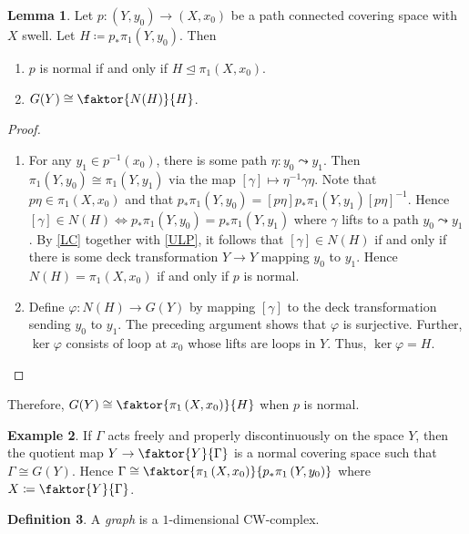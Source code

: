 \documentclass[10pt,letterpaper,cm]{nupset}
\theoremstyle{definition}
\newtheorem{definition}{Definition}[subsection]
\newtheorem{exmp}[definition]{Example}
\theoremstyle{theorem}
\newtheorem{lemma}[definition]{Lemma}
\theoremstyle{remark}
\newcommand{\1}{\mathbb{1}}
\newcommand{\0}{\vec 0}
\begin{document}
\begin{lemma}
Let $p: \left(Y, y_0\right) \to \left(X, x_0\right)$ be a path connected covering space with $X$ swell. Let $H\coloneqq  p_{\ast}\pi_1\left(Y, y_0\right)$. Then 
\begin{enumerate}
\item $p$ is normal if and only if $H \unlhd \pi_1\left(X, x_0\right)$.
\item $G(Y) \cong \faktor{N(H)}{H}$. 
\end{enumerate}
\end{lemma}
\begin{proof} $ $
\begin{enumerate}
\item For any $y_1 \in p^{-1}(x_0)$, there is some path $\eta : y_0 \leadsto y_1$. Then $\pi_1\left(Y, y_0\right) \cong \pi_1(Y, y_1)$ via the map $[\gamma] \mapsto \eta^{-1} \gamma \eta$. Note that $p \eta \in \pi_1\left(X, x_0\right)$ and that $p_{\ast} \pi_1\left(Y, y_0\right) = [p \eta]p_{\ast} \pi_1(Y, y_1) [p\eta]^{-1}$. Hence $[\gamma] \in N(H) \iff  p_{\ast} \pi_1\left(Y, y_0\right) = p_{\ast} \pi_1(Y, y_1)$ where $\gamma$ lifts to a path $y_0 \leadsto y_1$. By \cref{LC} together with \cref{ULP}, it follows that $[\gamma] \in N(H)$ if and only if there is some deck transformation $Y \to Y$ mapping $y_0$ to $y_1$. Hence $N(H) = \pi_1\left(X, x_0\right)$ if and only if $p$ is normal. 
\item Define $\varphi : N(H) \to G(Y)$ by mapping $[\gamma]$ to the deck transformation sending $y_0$ to $y_1$. The preceding argument shows that $\varphi$ is surjective. Further, $\ker{\varphi}$ consists of loop at $x_0$ whose lifts are loops in $Y$. Thus, $\ker{\varphi} = H$. 
\end{enumerate}
\end{proof}

Therefore, $G(Y) \cong \faktor{\pi_1\left(X, x_0\right)}{H}$ when $p$ is normal.

\begin{exmp}
If $\Gamma$ acts freely and properly discontinuously on the space $Y$, then the quotient map $Y \to \faktor{Y}{\Gamma}$ is a normal covering space such that $\Gamma \cong G(Y)$. Hence $\Gamma \cong \faktor{\pi_1\left(X, x_0\right)}{p_{\ast}\pi_1\left(Y, y_0\right)}$ where $X\coloneqq  \faktor{Y}{\Gamma}$.
\end{exmp}

\begin{definition}
A \textit{graph} is a $1$-dimensional CW-complex. 
\end{definition}
\end{document}
